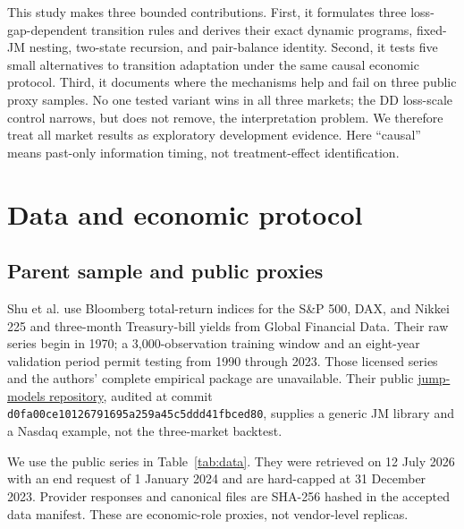 \documentclass[11pt]{article}
\begin{document}
This study makes three bounded contributions. First, it formulates three
loss-gap-dependent transition rules and derives their exact dynamic programs,
fixed-JM nesting, two-state recursion, and pair-balance identity. Second, it
tests five small alternatives to transition adaptation under the same causal
economic protocol. Third, it documents where the mechanisms help and fail on
three public proxy samples. No one tested variant wins in all three markets;
the DD loss-scale control narrows, but does not remove, the interpretation
problem. We therefore treat all market results as exploratory development
evidence. Here ``causal'' means past-only information timing, not
treatment-effect identification.

\section{Data and economic protocol}

\subsection{Parent sample and public proxies}

Shu et al. use Bloomberg total-return indices for the S\&P 500, DAX, and
Nikkei 225 and three-month Treasury-bill yields from Global Financial Data.
Their raw series begin in 1970; a 3,000-observation training window and an
eight-year validation period permit testing from 1990 through 2023. Those
licensed series and the authors' complete empirical package are unavailable.
Their public \href{https://github.com/Yizhan-Oliver-Shu/jump-models}{jump-models
repository}, audited at commit
\texttt{d0fa00ce10126791695a259a45c5ddd41fbced80}, supplies a generic JM library
and a Nasdaq example, not the three-market backtest.

We use the public series in Table~\ref{tab:data}. They were retrieved on
12 July 2026 with an end request of 1 January 2024 and are hard-capped at
31 December 2023. Provider responses and canonical files are SHA-256 hashed in
the accepted data manifest. These are economic-role proxies, not vendor-level
replicas.
\end{document}

